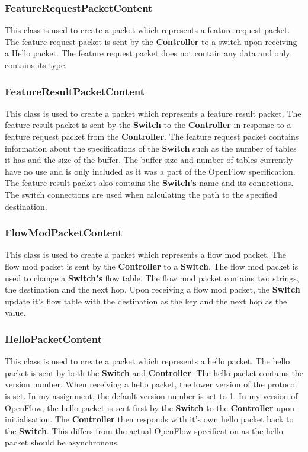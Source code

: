 \documentclass{article}
\begin{document}
\subsubsection{FeatureRequestPacketContent}
This class is used to create a packet which represents a feature request
packet. The feature request packet is sent by the \textbf{Controller} to a
switch upon receiving a Hello packet. The feature request packet does not
contain any data and only contains its type.

\subsubsection{FeatureResultPacketContent}
This class is used to create a packet which represents a feature result packet.
The feature result packet is sent by the \textbf{Switch} to the
\textbf{Controller} in response to a feature request packet from the
\textbf{Controller}. The feature request packet contains information about the
specifications of the \textbf{Switch} such as the number of tables it has and
the size of the buffer. The buffer size and number of tables currently have no
use and is only included as it was a part of the OpenFlow specification. The
feature result packet also contains the \textbf{Switch's} name and its
connections. The switch connections are used when calculating the path to the
specified destination.

\subsubsection{FlowModPacketContent}
This class is used to create a packet which represents a flow mod packet. The
flow mod packet is sent by the \textbf{Controller} to a \textbf{Switch}. The
flow mod packet is used to change a \textbf{Switch's} flow table. The flow mod
packet contains two strings, the destination and the next hop. Upon receiving a
flow mod packet, the \textbf{Switch} update it's flow table with the destination
as the key and the next hop as the value.

\subsubsection{HelloPacketContent}
This class is used to create a packet which represents a hello packet. The hello
packet is sent by both the \textbf{Switch} and \textbf{Controller}. The hello
packet contains the version number. When receiving a hello packet, the lower
version of the protocol is set. In my assignment, the default version number
is set to 1. In my version of OpenFlow, the hello packet is sent first by the
\textbf{Switch} to the \textbf{Controller} upon initialisation. The
\textbf{Controller} then responds with it's own hello packet back to the
\textbf{Switch}. This differs from the actual OpenFlow specification as the
hello packet should be asynchronous.
\end{document}
